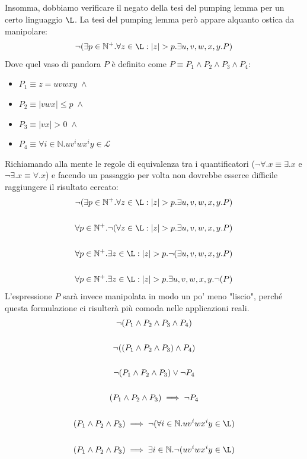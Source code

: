 \documentclass[class=book, crop=false, oneside, 12pt]{standalone}
\begin{document}
  \subparagraph*{}
  Insomma, dobbiamo verificare il negato della tesi del pumping lemma per un certo linguaggio \(\L\). La tesi del pumping lemma però appare alquanto ostica da manipolare:
  \begin{equation*}
    \neg(\exists p \in \mathbb{N}^+. \forall z \in \L: |z| > p. \exists u, v, w, x, y. P)
  \end{equation*}
  Dove quel vaso di pandora \(P\) è definito come \(P \equiv P_1 \land P_2 \land P_3 \land P_4\):
  \begin{itemize}
    \item \(P_1 \equiv z = uvwxy \; \land\)
    \item \(P_2 \equiv |vwx| \leq p \; \land\)
    \item \(P_3 \equiv |vx| > 0 \; \land\)
    \item \(P_4 \equiv \forall i \in \mathbb{N}.uv^iwx^iy \in \mathcal{L}\)
  \end{itemize}
  Richiamando alla mente le regole di equivalenza tra i quantificatori (\(\neg\forall.x \equiv \exists.x\) e \(\neg\exists.x \equiv \forall.x\)) e facendo un passaggio per volta non dovrebbe esserce difficile raggiungere il risultato cercato:
  \begin{gather*}
    \neg(\exists p \in \mathbb{N}^+. \forall z \in \L: |z| > p. \exists u, v, w, x, y. P) \\
    \\
    \forall p \in \mathbb{N}^+. \neg(\forall z \in \L: |z| > p. \exists u, v, w, x, y. P) \\
    \\
    \forall p \in \mathbb{N}^+. \exists z \in \L: |z| > p. \neg(\exists u, v, w, x, y. P) \\
    \\
    \forall p \in \mathbb{N}^+. \exists z \in \L: |z| > p. \exists u, v, w, x, y. \neg(P)
  \end{gather*}
  L'espressione \(P\) sarà invece manipolata in modo un po' meno "liscio", perché questa formulazione ci risulterà più comoda nelle applicazioni reali.
  \begin{gather*}
    \neg(P_1 \land P_2 \land P_3 \land P_4) \\
    \\
    \neg((P_1 \land P_2 \land P_3) \land P_4) \\
    \\
    \neg(P_1 \land P_2 \land P_3) \lor \neg P_4 \\
    \\
    (P_1 \land P_2 \land P_3) \implies \neg P_4 \\
    \\
    (P_1 \land P_2 \land P_3) \implies \neg(\forall i \in \mathbb{N}.uv^iwx^iy \in \L) \\
    \\
    (P_1 \land P_2 \land P_3) \implies \exists i \in \mathbb{N}. \neg(uv^iwx^iy \in \L)
  \end{gather*}
\end{document}

